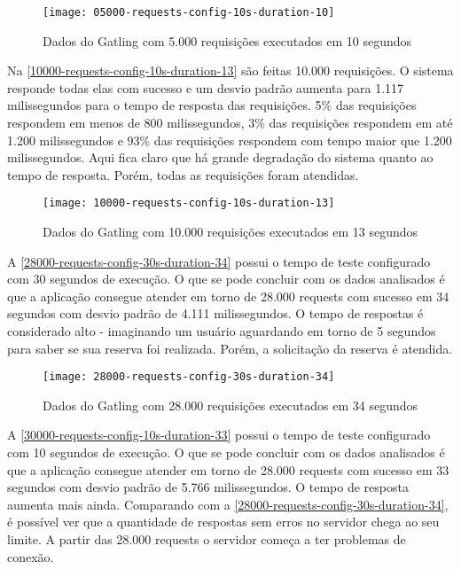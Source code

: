 \begin{figure}[h]
  \texttt{[image: 05000-requests-config-10s-duration-10]}
  \caption{Dados do Gatling com 5.000 requisições executados em 10 segundos}
  \label{05000-requests-config-10s-duration-10}
\end{figure}

Na \autoref{10000-requests-config-10s-duration-13} são feitas 10.000 requisições.
O sistema responde todas elas com sucesso e um desvio padrão aumenta para 1.117 milissegundos
para o tempo de resposta das requisições.
5\% das requisições respondem em menos de 800 milissegundos, 3\% das requisições
respondem em até 1.200 milissegundos e 93\% das requisições
respondem com tempo maior que 1.200 milissegundos. Aqui fica claro que há grande
degradação do sistema quanto ao tempo de resposta. Porém,
todas as requisições foram atendidas.

\begin{figure}[h]
  \texttt{[image: 10000-requests-config-10s-duration-13]}
  \caption{Dados do Gatling com 10.000 requisições executados em 13 segundos}
  \label{10000-requests-config-10s-duration-13}
\end{figure}

A \autoref{28000-requests-config-30s-duration-34} possui o tempo de teste configurado
com 30 segundos de execução.
O que se pode concluir com os dados analisados é que a aplicação consegue atender
em torno de 28.000 requests com sucesso em 34 segundos com desvio padrão de
4.111 milissegundos.
O tempo de respostas é considerado alto - imaginando um usuário aguardando em
torno de 5 segundos para saber se sua reserva foi realizada.
Porém, a solicitação da reserva é atendida.

\begin{figure}[h]
  \texttt{[image: 28000-requests-config-30s-duration-34]}
  \caption{Dados do Gatling com 28.000 requisições executados em 34 segundos}
  \label{28000-requests-config-30s-duration-34}
\end{figure}

A \autoref{30000-requests-config-10s-duration-33} possui o tempo de teste configurado
com 10 segundos de execução.
O que se pode concluir com os dados analisados é que a aplicação consegue atender
em torno de 28.000 requests com sucesso em 33 segundos com desvio padrão de
5.766 milissegundos.
O tempo de resposta aumenta mais ainda.
Comparando com a \autoref{28000-requests-config-30s-duration-34}, é possível ver
que a quantidade de respostas sem erros no servidor chega ao seu limite.
A partir das 28.000 requests o servidor começa a ter problemas de conexão.

